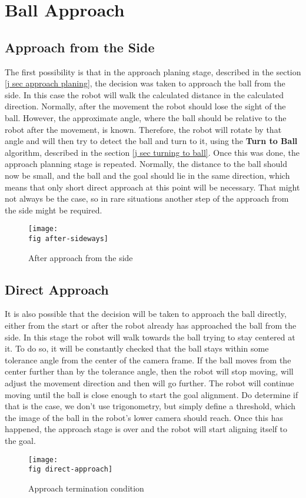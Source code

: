 \section{Ball Approach}
\label{p sec approach}

\subsection*{Approach from the Side}

The first possibility is that in the approach planing stage, described in the
section \ref{j sec approach planing}, the decision was taken to approach the
ball from the side. In this case the robot will walk the calculated distance in
the calculated direction. Normally, after the movement the robot should lose
the sight of the ball. However, the approximate angle, where the ball should be
relative to the robot after the movement, is known. Therefore, the robot will
rotate by that angle and will then try to detect the ball and turn to it, using
the \textbf{Turn to Ball} algorithm, described in the section \ref {j sec
  turning to ball}. Once this was done, the approach planning stage is
repeated. Normally, the distance to the ball should now be small, and the ball
and the goal should lie in the same direction, which means that only short
direct approach at this point will be necessary. That might not always be the
case, so in rare situations another step of the approach from the side might be
required.

\begin{figure}[ht]
  \texttt{[image: \\fig after-sideways]}
  \caption{After approach from the side}
  \label{p figure after-sideways}
\end{figure}

\subsection*{Direct Approach}

It is also possible that the decision will be taken to approach the ball
directly, either from the start or after the robot already has approached the
ball from the side. In this stage the robot will walk towards the ball trying
to stay centered at it. To do so, it will be constantly checked that the ball
stays within some tolerance angle from the center of the camera frame. If the
ball moves from the center further than by the tolerance angle, then the robot
will stop moving, will adjust the movement direction and then will go further.
The robot will continue moving until the ball is close enough to start the goal
alignment. Do determine if that is the case, we don't use trigonometry, but
simply define a threshold, which the image of the ball in the robot's lower
camera should reach. Once this has happened, the approach stage is over and the
robot will start aligning itself to the goal.

\begin{figure}[ht]
  \texttt{[image: \\fig direct-approach]}
  \caption{Approach termination condition}
  \label{p figure direct-approach}
\end{figure}
